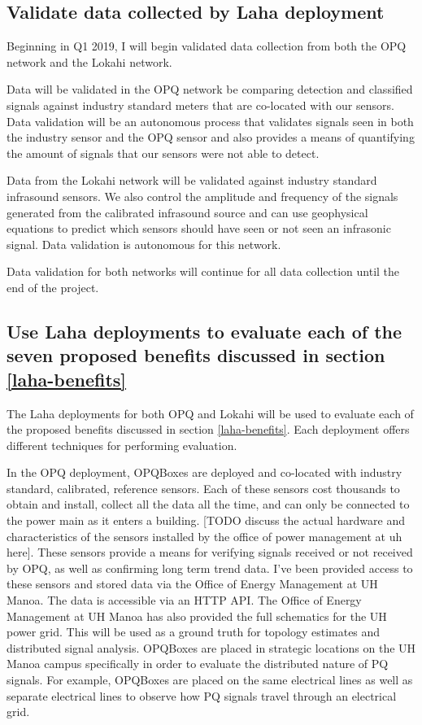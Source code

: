 \subsection{Validate data collected by Laha deployment}
Beginning in Q1 2019, I will begin validated data collection from both the OPQ network and the Lokahi network. 

Data will be validated in the OPQ network be comparing detection and classified signals against industry standard meters that are co-located with our sensors. Data validation will be an autonomous process that validates signals seen in both the industry sensor and the OPQ sensor and also provides a means of quantifying the amount of signals that our sensors were not able to detect. 

Data from the Lokahi network will be validated against industry standard infrasound sensors. We also control the amplitude and frequency of the signals generated from the calibrated infrasound source and can use geophysical equations to predict which sensors should have seen or not seen an infrasonic signal. Data validation is autonomous for this network.

Data validation for both networks will continue for all data collection until the end of the project.

\subsection{Use Laha deployments to evaluate each of the seven proposed benefits discussed in section \ref{laha-benefits}}
The Laha deployments for both OPQ and Lokahi will be used to evaluate each of the proposed benefits discussed in section \ref{laha-benefits}. Each deployment offers different techniques for performing evaluation. 

In the OPQ deployment, OPQBoxes are deployed and co-located with industry standard, calibrated, reference sensors. Each of these sensors cost thousands to obtain and install, collect all the data all the time, and can only be connected to the power main as it enters a building. [TODO discuss the actual hardware and characteristics of the sensors installed by the office of power management at uh here]. These sensors provide a means for verifying signals received or not received by OPQ, as well as confirming long term trend data. I've been provided access to these sensors and stored data via the Office of Energy Management at UH Manoa. The data is accessible via an HTTP API. The Office of Energy Management at UH Manoa has also provided the full schematics for the UH power grid. This will be used as a ground truth for topology estimates and distributed signal analysis. OPQBoxes are placed in strategic locations on the UH Manoa campus specifically in order to evaluate the distributed nature of PQ signals. For example, OPQBoxes are placed on the same electrical lines as well as separate electrical lines to observe how PQ signals travel through an electrical grid.

